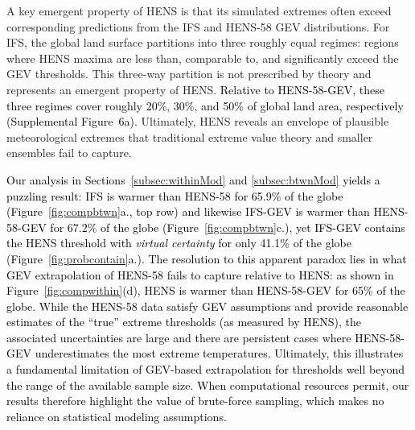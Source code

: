 \documentclass[draft]{agujournal2019}
\newcommand{\newTxt}{\textcolor{black}}
\begin{document}
A key emergent property of HENS is that its simulated extremes often exceed corresponding predictions from the IFS and HENS-58 GEV distributions. For IFS, the global land surface partitions into three roughly equal regimes: regions where HENS maxima are less than, comparable to, and significantly exceed the GEV thresholds.
This three-way partition is not prescribed by theory and represents an emergent property of HENS. \newTxt{Relative to HENS-58-GEV, these three regimes cover roughly 20\%, 30\%, and 50\% of global land area, respectively (Supplemental Figure~6a). %
}
Ultimately, HENS reveals an envelope of plausible meteorological extremes that traditional extreme value theory and smaller ensembles fail to capture.

\newTxt{
Our analysis in Sections~\ref{subsec:withinMod} and \ref{subsec:btwnMod} yields a puzzling result: IFS is warmer than HENS-58 for 65.9\% of the globe (Figure~\ref{fig:compbtwn}a., top row) and likewise IFS-GEV is warmer than HENS-58-GEV for 67.2\% of the globe (Figure~\ref{fig:compbtwn}c.), yet IFS-GEV contains the HENS threshold with \textit{virtual certainty} for only 41.1\% of the globe (Figure~\ref{fig:probcontain}a.). The resolution to this apparent paradox lies in what GEV extrapolation of HENS-58 fails to capture relative to HENS: as shown in Figure~\ref{fig:compwithin}(d), HENS is warmer than HENS-58-GEV for 65\% of the globe. While the HENS-58 data satisfy GEV assumptions and provide reasonable estimates of the ``true'' extreme thresholds (as measured by HENS), the associated uncertainties are large and there are persistent cases where HENS-58-GEV underestimates the most extreme temperatures. Ultimately, this illustrates a fundamental limitation of GEV-based extrapolation for thresholds well beyond the range of the available sample size.
When computational resources permit, our results therefore highlight the value of brute-force sampling, which makes no reliance on statistical modeling assumptions.
}
\end{document}
